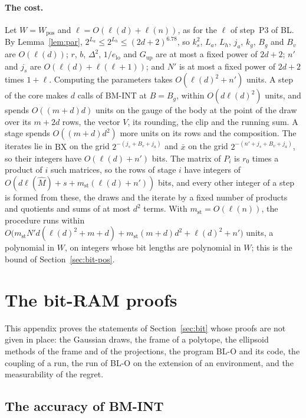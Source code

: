 \documentclass[11pt]{amsart}
\theoremstyle{definition}
\numberwithin{equation}{section}
\begin{document}
\paragraph{The cost.} Let $W=W_{\mathrm{pos}}$ and $\ell=O(\ell(d)+\ell(n))$, as for the $\ell$ of step~P3 of BL. By Lemma~\ref{lem:par}, $2^{L_a}\le2^{L_h}\le(2d+2)^{6.78}$, so $k_s^2$, $L_a$, $L_h$, $j_a$, $k_g$, $B_g$ and $B_v$ are $O(\ell(d))$; $r$, $b$, $\Delta^2$, $1/e_{\mathrm{lo}}$ and $G_{\mathrm{up}}$ are at most a fixed power of $2d+2$; $n'$ and $j_s$ are $O(\ell(d)+\ell(\ell+1))$; and $N'$ is at most a fixed power of $2d+2$ times $1+\ell$. Computing the parameters takes $O(\ell(d)^2+n')$ units. A step of the core makes $d$ calls of BM-INT at $B=B_g$, within $O(d\ell(d)^2)$ units, and spends $O((m+d)d)$ units on the gauge of the body at the point of the draw over its $m+2d$ rows, the vector $V$, its rounding, the clip and the running sum. A stage spends $O((m+d)d^2)$ more units on its rows and the composition. The iterates lie in $\mathrm{BX}$ on the grid $2^{-(j_s+B_v+j_a)}$ and $\bar x$ on the grid $2^{-(n'+j_s+B_v+j_a)}$, so their integers have $O(\ell(d)+n')$ bits. The matrix of $P_i$ is $r_0$ times a product of $i$ such matrices, so the rows of stage $i$ have integers of $O(d\ell(\hat M)+s+m_{\mathrm{st}}(\ell(d)+n'))$ bits, and every other integer of a step is formed from these, the draws and the iterate by a fixed number of products and quotients and sums of at most $d^2$ terms. With $m_{\mathrm{st}}=O(\ell(n))$, the procedure runs within $O\bigl(m_{\mathrm{st}}N'd(\ell(d)^2+m+d)+m_{\mathrm{st}}(m+d)d^2+\ell(d)^2+n'\bigr)$ units, a polynomial in $W$, on integers whose bit lengths are polynomial in $W$; this is the bound of Section~\ref{sec:bit-pos}.

\section{The bit-RAM proofs}\label{app:bitram}

This appendix proves the statements of Section~\ref{sec:bit} whose proofs are not given in place: the Gaussian draws, the frame of a polytope, the ellipsoid methods of the frame and of the projections, the program BL-O and its code, the coupling of a run, the run of BL-O on the extension of an environment, and the measurability of the regret.

\subsection{The accuracy of BM-INT}\label{app:gs}
\end{document}

